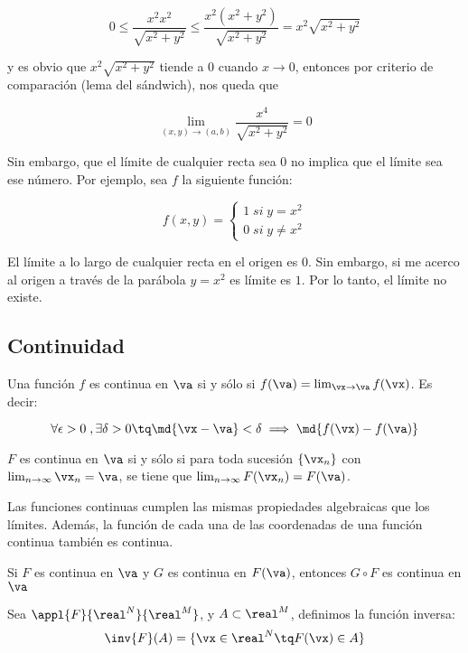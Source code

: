 \documentclass[12pt,a4paper,titlepage]{apuntes}
\begin{document}
\[ 0 \leq \frac{x^2x^2}{\sqrt{x^2+y^2}} \leq \frac{x^2(x^2+y^2)}{\sqrt{x^2+y^2}} = x^2\sqrt{x^2+y^2} \]

y es obvio que $x^2\sqrt{x^2+y^2}$ tiende a $0$ cuando $x\to 0$, entonces por criterio de comparación (lema del sándwich), nos queda que

\[\lim_{(x,y)\to(a,b)}\frac{x^4}{\sqrt{x^2+y^2}} = 0 \]

Sin embargo, que el límite de cualquier recta sea 0 no implica que el límite sea ese número. Por ejemplo, sea $f$ la siguiente función:

\[ f (x,y) = \left\lbrace \begin{matrix} 1\; si\; y=x^2 \\ 0 \; si \; y\neq x^2  \end{matrix}\right. \]

El límite a lo largo de cualquier recta en el origen es $0$. Sin embargo, si me acerco al origen a través de la parábola $y=x^2$ es límite es $1$. Por lo tanto, el límite no existe.

\subsection{Continuidad}

\begin{defn} Una función $f$ es continua en $\va$ si y sólo si $f(\va) = \lim_{\vx\to\va} f(\vx)$. Es decir:

\[ \forall \epsilon > 0\; , \exists \delta > 0 \tq \md{\vx-\va} < \delta \implies \md{f(\vx)-f(\va)} \]
\end{defn}

\begin{theorem}
$F$ es continua en $\va$ si y sólo si para toda sucesión $\{\vx_n\}$ con $\lim_{n\to\infty} \vx_n = \va$, se tiene que $\lim_{n\to\infty} F(\vx_n) = F(\va)$.
\end{theorem}

Las funciones continuas cumplen las mismas propiedades algebraicas que los límites. Además, la función de cada una de las coordenadas de una función continua también es continua.
\begin{theorem}
Si $F$ es continua en $\va$ y $G$ es continua en $F(\va)$, entonces $G\circ F$ es continua en $\va$
\end{theorem}
\begin{defn}[Inversa]
Sea $\appl{F}{\real^N}{\real^M}$, y $A\subset \real^M$, definimos la función inversa: \[\inv{F}(A) = \{ \vx\in\real^N\tq F(\vx) \in A \}\]
\end{defn}
\end{document}
